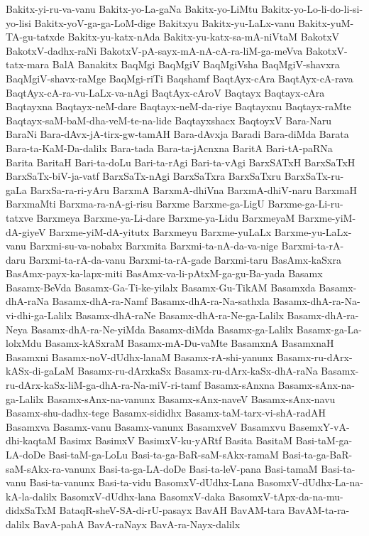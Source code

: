 {Bakitx-yi-ru-va-vanu
Bakitx-yo-La-gaNa
Bakitx-yo-LiMtu
Bakitx-yo-Lo-li-do-li-si-yo-lisi
Bakitx-yoV-ga-ga-LoM-dige
Bakitxyu
Bakitx-yu-LaLx-vanu
Bakitx-yuM-TA-gu-tatxde
Bakitx-yu-katx-nAda
Bakitx-yu-katx-sa-mA-niVtaM
BakotxV
BakotxV-dadhx-raNi
BakotxV-pA-sayx-mA-nA-cA-ra-liM-ga-meVva
BakotxV-tatx-mara
BalA
Banakitx
BaqMgi
BaqMgiV
BaqMgiVsha
BaqMgiV-shavxra
BaqMgiV-shavx-raMge
BaqMgi-riTi
Baqshamf
BaqtAyx-cAra
BaqtAyx-cA-rava
BaqtAyx-cA-ra-vu-LaLx-va-nAgi
BaqtAyx-cAroV
Baqtayx
Baqtayx-cAra
Baqtayxna
Baqtayx-neM-dare
Baqtayx-neM-da-riye
Baqtayxnu
Baqtayx-raMte
Baqtayx-saM-baM-dha-veM-te-na-lide
Baqtayxshacx
BaqtoyxV
Bara-Naru
BaraNi
Bara-dAvx-jA-tirx-gw-tamAH
Bara-dAvxja
Baradi
Bara-diMda
Barata
Bara-ta-KaM-Da-dalilx
Bara-tada
Bara-ta-jAcnxna
BaritA
Bari-tA-paRNa
Barita
BaritaH
Bari-ta-doLu
Bari-ta-rAgi
Bari-ta-vAgi
BarxSATxH
BarxSaTxH
BarxSaTx-biV-ja-vatf
BarxSaTx-nAgi
BarxSaTxra
BarxSaTxru
BarxSaTx-ru-gaLa
BarxSa-ra-ri-yAru
BarxmA
BarxmA-dhiVna
BarxmA-dhiV-naru
BarxmaH
BarxmaMti
Barxma-ra-nA-gi-risu
Barxme
Barxme-ga-LigU
Barxme-ga-Li-ru-tatxve
Barxmeya
Barxme-ya-Li-dare
Barxme-ya-Lidu
BarxmeyaM
Barxme-yiM-dA-giyeV
Barxme-yiM-dA-yitutx
Barxmeyu
Barxme-yuLaLx
Barxme-yu-LaLx-vanu
Barxmi-su-va-nobabx
Barxmita
Barxmi-ta-nA-da-va-nige
Barxmi-ta-rA-daru
Barxmi-ta-rA-da-vanu
Barxmi-ta-rA-gade
Barxmi-taru
BasAmx-kaSxra
BasAmx-payx-ka-lapx-miti
BasAmx-va-li-pAtxM-ga-gu-Ba-yada
Basamx
Basamx-BeVda
Basamx-Ga-Ti-ke-yilalx
Basamx-Gu-TikAM
Basamxda
Basamx-dhA-raNa
Basamx-dhA-ra-Namf
Basamx-dhA-ra-Na-sathxla
Basamx-dhA-ra-Na-vi-dhi-ga-Lalilx
Basamx-dhA-raNe
Basamx-dhA-ra-Ne-ga-Lalilx
Basamx-dhA-ra-Neya
Basamx-dhA-ra-Ne-yiMda
Basamx-diMda
Basamx-ga-Lalilx
Basamx-ga-La-lolxMdu
Basamx-kASxraM
Basamx-mA-Du-vaMte
BasamxnA
BasamxnaH
Basamxni
Basamx-noV-dUdhx-lanaM
Basamx-rA-shi-yanunx
Basamx-ru-dArx-kASx-di-gaLaM
Basamx-ru-dArxkaSx
Basamx-ru-dArx-kaSx-dhA-raNa
Basamx-ru-dArx-kaSx-liM-ga-dhA-ra-Na-miV-ri-tamf
Basamx-sAnxna
Basamx-sAnx-na-ga-Lalilx
Basamx-sAnx-na-vanunx
Basamx-sAnx-naveV
Basamx-sAnx-navu
Basamx-shu-dadhx-tege
Basamx-sididhx
Basamx-taM-tarx-vi-shA-radAH
Basamxva
Basamx-vanu
Basamx-vanunx
BasamxveV
Basamxvu
BasemxY-vA-dhi-kaqtaM
Basimx
BasimxV
BasimxV-ku-yARtf
Basita
BasitaM
Basi-taM-ga-LA-doDe
Basi-taM-ga-LoLu
Basi-ta-ga-BaR-saM-sAkx-ramaM
Basi-ta-ga-BaR-saM-sAkx-ra-vanunx
Basi-ta-ga-LA-doDe
Basi-ta-leV-pana
Basi-tamaM
Basi-ta-vanu
Basi-ta-vanunx
Basi-ta-vidu
BasomxV-dUdhx-Lana
BasomxV-dUdhx-La-na-kA-la-dalilx
BasomxV-dUdhx-lana
BasomxV-daka
BasomxV-tApx-da-na-mu-didxSaTxM
BataqR-sheV-SA-di-rU-pasayx
BavAH
BavAM-tara
BavAM-ta-ra-dalilx
BavA-pahA
BavA-raNayx
BavA-ra-Nayx-dalilx
}
